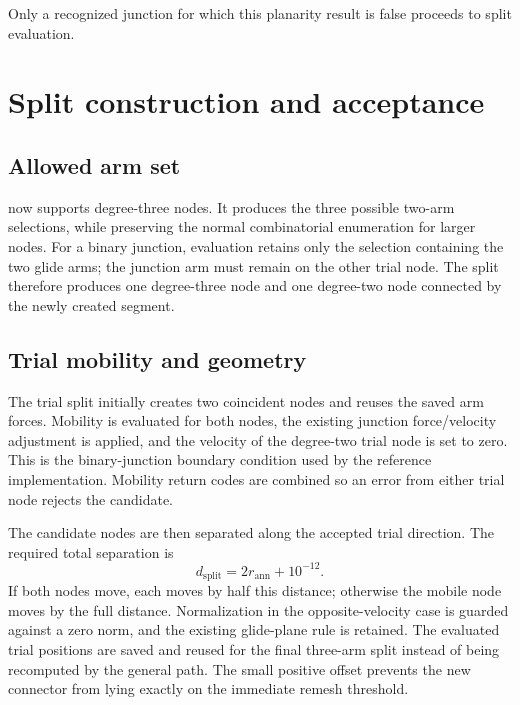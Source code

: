 \documentclass[11pt]{article}
\newcommand{\code}[1]{\texttt{\detokenize{#1}}}
\begin{document}
Only a recognized junction for which this planarity result is false proceeds
to split evaluation.

\section{Split construction and acceptance}

\subsection{Allowed arm set}

\code{SMNGetArmSets()} now supports degree-three nodes.  It produces the three
possible two-arm selections, while preserving the normal combinatorial
enumeration for larger nodes.  For a binary junction, evaluation retains only
the selection containing the two glide arms; the junction arm must remain on
the other trial node.  The split therefore produces one degree-three node and
one degree-two node connected by the newly created segment.

\subsection{Trial mobility and geometry}

The trial split initially creates two coincident nodes and reuses the saved
arm forces.  Mobility is evaluated for both nodes, the existing junction
force/velocity adjustment is applied, and the velocity of the degree-two
trial node is set to zero.  This is the binary-junction boundary condition
used by the reference implementation.  Mobility return codes are combined so
an error from either trial node rejects the candidate.

The candidate nodes are then separated along the accepted trial direction.
The required total separation is
\begin{equation}
  d_{\mathrm{split}} = 2r_{\mathrm{ann}} + 10^{-12}.
\end{equation}
If both nodes move, each moves by half this distance; otherwise the mobile
node moves by the full distance.  Normalization in the opposite-velocity
case is guarded against a zero norm, and the existing glide-plane rule is
retained.  The evaluated trial positions are saved and reused for the final
three-arm split instead of being recomputed by the general
\code{CalcJunctionLen()} path.  The small positive offset prevents the new
connector from lying exactly on the immediate remesh threshold.
\end{document}
